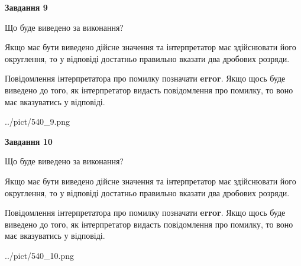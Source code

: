 \documentclass[12pt, ukrainian]{article}
\begin{document}
{\begin {Large}
{\begin {center}\textbf{Завдання 9}\end {center}}\par
Що буде виведено за виконання? \par

Якщо має бути виведено дійсне значення та інтерпретатор має здійснювати його округлення, 
то у відповіді достатньо правильно вказати два дробових розряди.

Повідомлення інтерпретатора про помилку позначати \textbf{error}.
Якщо щось буде виведено до того, як інтерпретатор видасть повідомлення про помилку, 
то воно має вказуватись у відповіді. \par

\begin{center}
	{../pict/540_9.png}
\end{center}
\newpage

{\begin {center}\textbf{Завдання 10}\end {center}}\par
Що буде виведено за виконання? \par

Якщо має бути виведено дійсне значення та інтерпретатор має здійснювати його округлення, 
то у відповіді достатньо правильно вказати два дробових розряди.

Повідомлення інтерпретатора про помилку позначати \textbf{error}.
Якщо щось буде виведено до того, як інтерпретатор видасть повідомлення про помилку, 
то воно має вказуватись у відповіді. \par

\begin{center}
	{../pict/540_10.png}
\end{center}
\newpage

\end {Large}}
\end{document}
